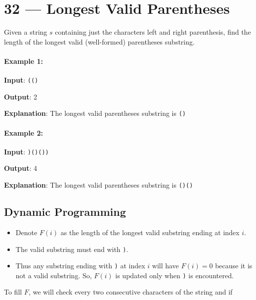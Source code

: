 \section{32 --- Longest Valid Parentheses}
Given a string $s$ containing just the characters left and right parenthesis, find the length of the longest valid (well-formed) parentheses substring.

\paragraph{Example 1:}

\begin{flushleft}
\textbf{Input}: \texttt{(()}

\textbf{Output}: 2

\textbf{Explanation}: The longest valid parentheses substring is \texttt{()}
\end{flushleft}

\paragraph{Example 2:}
\begin{flushleft}

\textbf{Input}: \texttt{)()())}

\textbf{Output}: 4

\textbf{Explanation}: The longest valid parentheses substring is \texttt{()()}
\end{flushleft}

\subsection{Dynamic Programming}

\begin{itemize}
\item Denote $F(i)$ as the length of the longest valid substring ending at index $i$.
\item The valid substring must end with \texttt{)}.
\item Thus any substring ending with \texttt{)} at index $i$ will have $F(i)=0$ because it is not a valid substring. So, $F(i)$ is updated only when \texttt{)} is encountered.
\end{itemize}

To fill $F$, we will check every two consecutive characters of the string and if

